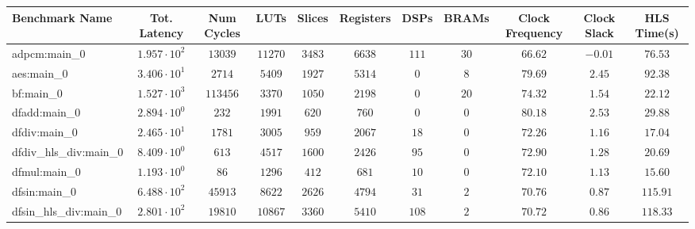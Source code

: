 \begin{tabular}{|l|c|c|c|c|c|c|c|c|c|c|}
\hline
Benchmark Name          & Tot. Latency           & Num Cycles & LUTs      & Slices    & Registers & DSPs    & BRAMs   & Clock Frequency & Clock Slack & HLS Time(s) \\
\hline
adpcm:main\_0           & $ 1.957 \cdot 10^{2} $ & $ 13039  $ & $ 11270 $ & $ 3483  $ & $ 6638  $ & $ 111 $ & $ 30  $ & $ 66.62       $ & $ -0.01   $ & $ 76.53   $ \\
aes:main\_0             & $ 3.406 \cdot 10^{1} $ & $ 2714   $ & $ 5409  $ & $ 1927  $ & $ 5314  $ & $ 0   $ & $ 8   $ & $ 79.69       $ & $ 2.45    $ & $ 92.38   $ \\
bf:main\_0              & $ 1.527 \cdot 10^{3} $ & $ 113456 $ & $ 3370  $ & $ 1050  $ & $ 2198  $ & $ 0   $ & $ 20  $ & $ 74.32       $ & $ 1.54    $ & $ 22.12   $ \\
dfadd:main\_0           & $ 2.894 \cdot 10^{0} $ & $ 232    $ & $ 1991  $ & $ 620   $ & $ 760   $ & $ 0   $ & $ 0   $ & $ 80.18       $ & $ 2.53    $ & $ 29.88   $ \\
dfdiv:main\_0           & $ 2.465 \cdot 10^{1} $ & $ 1781   $ & $ 3005  $ & $ 959   $ & $ 2067  $ & $ 18  $ & $ 0   $ & $ 72.26       $ & $ 1.16    $ & $ 17.04   $ \\
dfdiv\_hls\_div:main\_0 & $ 8.409 \cdot 10^{0} $ & $ 613    $ & $ 4517  $ & $ 1600  $ & $ 2426  $ & $ 95  $ & $ 0   $ & $ 72.90       $ & $ 1.28    $ & $ 20.69   $ \\
dfmul:main\_0           & $ 1.193 \cdot 10^{0} $ & $ 86     $ & $ 1296  $ & $ 412   $ & $ 681   $ & $ 10  $ & $ 0   $ & $ 72.10       $ & $ 1.13    $ & $ 15.60   $ \\
dfsin:main\_0           & $ 6.488 \cdot 10^{2} $ & $ 45913  $ & $ 8622  $ & $ 2626  $ & $ 4794  $ & $ 31  $ & $ 2   $ & $ 70.76       $ & $ 0.87    $ & $ 115.91  $ \\
dfsin\_hls\_div:main\_0 & $ 2.801 \cdot 10^{2} $ & $ 19810  $ & $ 10867 $ & $ 3360  $ & $ 5410  $ & $ 108 $ & $ 2   $ & $ 70.72       $ & $ 0.86    $ & $ 118.33  $ \\

\end{tabular}
